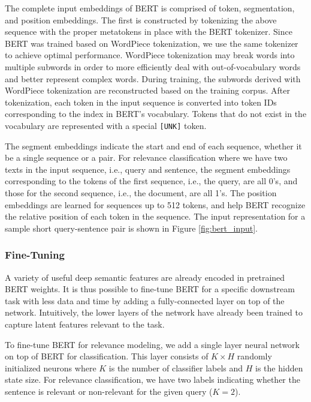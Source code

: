 The complete input embeddings of BERT is comprised of token, segmentation, and position embeddings.
The first is constructed by tokenizing the above sequence with the proper metatokens in place with the BERT tokenizer.
Since BERT was trained based on WordPiece tokenization, we use the same tokenizer to achieve optimal performance.
WordPiece tokenization may break words into multiple subwords in order to more efficiently deal with out-of-vocabulary words and better represent complex words.
During training, the subwords derived with WordPiece tokenization are reconstructed based on the training corpus.
After tokenization, each token in the input sequence is converted into token IDs corresponding to the index in BERT's vocabulary.
Tokens that do not exist in the vocabulary are represented with a special \texttt{[UNK]} token.

The segment embeddings indicate the start and end of each sequence, whether it be a single sequence or a pair.
For relevance classification where we have two texts in the input sequence, i.e., query and sentence, the segment embeddings corresponding to the tokens of the first sequence, i.e., the query, are all 0's, and those for the second sequence, i.e., the document, are all 1's.
The position embeddings are learned for sequences up to 512 tokens, and help BERT recognize the relative position of each token in the sequence.
The input representation for a sample short query-sentence pair is shown in Figure \ref{fig:bert_input}.


\subsubsection{Fine-Tuning}

A variety of useful deep semantic features are already encoded in pretrained BERT weights.
It is thus possible to fine-tune BERT for a specific downstream task with less data and time by adding a fully-connected layer on top of the network.
Intuitively, the lower layers of the network have already been trained to capture latent features relevant to the task.

To fine-tune BERT for relevance modeling, we add a single layer neural network on top of BERT for classification.
This layer consists of $ K \times H $ randomly initialized neurons where $ K $ is the number of classifier labels and $ H$ is the hidden state size.
For relevance classification, we have two labels indicating whether the sentence is relevant or non-relevant for the given query ($ K = 2 $).

